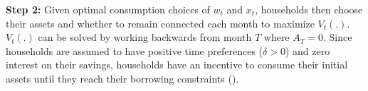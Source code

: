 \documentclass[12pt]{article}
\begin{document}

\textbf{Step 2:}  Given optimal consumption choices of $w_t$ and $x_t$, households then choose their assets and whether to remain connected each month to maximize $V_t(.)$.  $V_t(.)$ can be solved by working backwards from month $T$ where $A_T = 0$.  Since households are assumed to have positive time preferences ($\delta>0$) and zero interest on their savings, households have an incentive to consume their initial assets until they reach their borrowing constraints (\cite{deaton1991saving}).  





\end{document}
